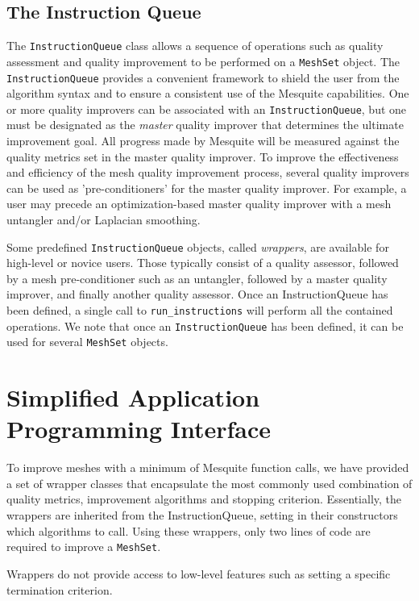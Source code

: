\documentclass[letter]{report}
\begin{document}
\subsection{The Instruction Queue} \label{sec:IQ}

The \texttt{InstructionQueue} class allows a sequence of operations
such as quality assessment and quality improvement to be performed on
a \texttt{MeshSet} object. The \texttt{InstructionQueue} 
provides a convenient framework to shield the user
from the algorithm syntax and to ensure a consistent use of the
Mesquite capabilities.  One or more quality improvers can be
associated with an {\tt InstructionQueue}, but one must be designated
as the {\it master} quality improver that determines the ultimate 
improvement goal.  All progress made by Mesquite will be
measured against the quality metrics set in the master quality
improver.  To improve the effectiveness and efficiency of the mesh
quality improvement process, several quality improvers can be used as
'pre-conditioners' for the master quality improver.  For example, a
user may precede an optimization-based master quality improver with a
mesh untangler and/or Laplacian smoothing.

Some predefined \texttt{InstructionQueue} objects, called \emph
{wrappers}, are available for high-level or novice users. Those
typically consist of a quality assessor, followed by a mesh
pre-conditioner such as an untangler, followed by a master quality
improver, and finally another quality assessor.  Once an
InstructionQueue has been defined, a single call to \texttt{run\_instructions} 
will perform all the contained operations.  We note
that once an \texttt{InstructionQueue} has been defined, it can be used
for several \texttt{MeshSet} objects.


\section{Simplified Application Programming Interface}
\label{sec:wrappers}
To improve meshes with a minimum of Mesquite function calls, we have 
provided a set of wrapper classes that encapsulate the 
most commonly used combination of quality metrics, improvement
algorithms and stopping criterion. Essentially, the wrappers are
inherited from the InstructionQueue, setting in their constructors
which algorithms to call. Using these wrappers, only
two lines of code are required to improve a \texttt{MeshSet}.

Wrappers do not provide access to low-level 
features such as setting a specific
termination criterion.  
\end{document}
